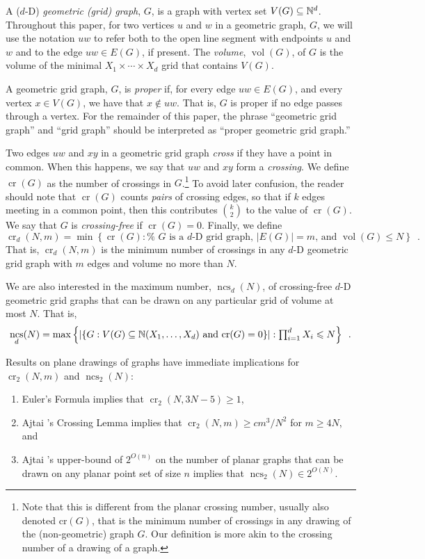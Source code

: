 \documentclass[12pt]{article}
\newcommand{\n}{N}
\DeclareMathOperator{\crs}{cr}
\DeclareMathOperator{\ncs}{ncs}
\DeclareMathOperator{\volume}{vol}
\begin{document}
A ($d$-D) \emph{geometric (grid) graph}, $G$, is a graph with vertex
set $V(G)\subseteq \mathbb{N}^d$.  Throughout this paper, for two vertices $u$
and $w$ in a geometric graph, $G$, we will use the notation $uw$ to
refer both to the open line segment with endpoints $u$ and $w$ and to
the edge $uw\in E(G)$, if present.    The \emph{volume}, $\volume(G)$,
of $G$ is the volume of the minimal $X_1\times\cdots\times X_d$ grid
that contains $V(G)$.

A geometric grid graph, $G$, is \emph{proper} if, for every edge $uw\in
E(G)$, and every vertex $x\in V(G)$, we have that $x\not\in uw$.  That is,
$G$ is proper if no edge passes through a vertex.  For the remainder
of this paper, the phrase ``geometric grid graph'' and ``grid graph''
should be interpreted as ``proper geometric grid graph.''

Two edges $uw$ and $xy$ in a geometric grid graph \emph{cross} if they have a
point in common.  When this happens, we say that $uw$ and $xy$ form
a \emph{crossing}.  We define $\crs(G)$ as the number of crossings
in $G$.\footnote{Note that this is different from the planar crossing
number, usually also denoted $\mathrm{cr}(G)$, that is the minimum number of
crossings in any drawing of the (non-geometric) graph $G$.  Our definition
is more akin to the crossing number of a drawing of a graph.}
To avoid later confusion, the reader should note that 
$\crs(G)$ counts \emph{pairs} of crossing edges, so that if $k$ edges meeting in 
a common point, then this contributes $\binom{k}{2}$ to the value of $\crs(G)$.
We say that
$G$ is \emph{crossing-free} if $\crs(G)=0$.  Finally, we define
\[ \crs_d(\n,m)=\min\left\{\crs(G):\mbox{%
    $G$ is a $d$-D grid graph, $|E(G)|=m$, and $\volume(G)\le\n$}
   \right\} \enspace .
\]
That is, $\crs_d(\n,m)$ is the minimum number of crossings in any
$d$-D geometric grid graph with $m$ edges and volume no more
than $\n$.

We are also interested in the maximum number, $\ncs_d(\n)$, of crossing-free
$d$-D geometric grid graphs that can be drawn on any particular grid of
volume at most $\n$.  That is,
\[
  \ncs_d(\n) = \max\left\{
     \left|\left\{G:\mbox{$V(G)\subseteq\N(X_1,\ldots,X_d)$
            and $\crs(G)=0$} \right\}\right| :
    \mbox{$\prod_{i=1}^d X_i \le\n$} \right\} \enspace .
\]

Results on plane drawings of graphs have immediate implications
for $\crs_2(\n,m)$ and $\ncs_2(\n)$:
\begin{enumerate}
  \item  Euler's Formula implies that $\crs_2(\n,3\n-5)\ge 1$,
  \item  Ajtai \etal's Crossing Lemma implies that $\crs_2(\n,m)\ge
  cm^3/\n^2$ for $m\ge 4\n$, and
  \item  Ajtai \etal's upper-bound of $2^{O(n)}$ on the number of planar
  graphs that can be drawn on any planar point set of size $n$ implies that
  $\ncs_2(\n)\in 2^{O(\n)}$.
\end{enumerate}
\end{document}
